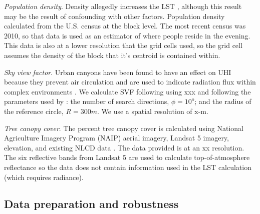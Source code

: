 \documentclass[final,3p,times,twocolumn,sort&compress]{elsarticle}
\begin{document}

\textit{Population density}. Density allegedly increases the LST \cite{Li2017-yl}, although this result may be the result of confounding with other factors. Population density calculated from the U.S. census at the block level. The most recent census was 2010, so that data is used as an estimator of where people reside in the evening. This data is also at a lower resolution that the grid cells used, so the grid cell assumes the density of the block that it's centroid is contained within.

\textit{Sky view factor}. Urban canyons have been found to have an effect on UHI because they prevent air circulation \cite{Landsberg1981-mq, Chun2017-mm} and are used to indicate radiation flux within complex environments \cite{Matzarakis2007-xy}. We calculate SVF following using xxx and following the parameters used by \cite{Chun2017-mm}: the number of search directions, $\phi=10^o$; and the radius of the reference circle, $R=300m$. We use a spatial resolution of x-m.

\textit{Tree canopy cover}. The percent tree canopy cover is calculated using National Agriculture Imagery Program (NAIP) aerial imagery, Landsat 5 imagery, elevation, and existing NLCD data \cite{Coulston2012-uu, Homer2015-ce}. The data provided is at an xx resolution. The six reflective bands from Landsat 5 are used to calculate top-of-atmosphere reflectance \cite{Coulston2012-uu} so the data does not contain information used in the LST calculation (which requires radiance). 

\subsection{Data preparation and robustness}
\end{document}
